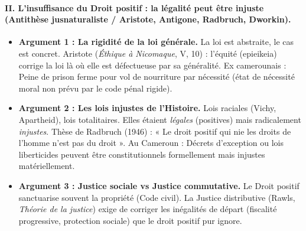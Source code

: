 \documentclass[11pt]{article}
\newcommand{\cle}[1]{{\popxbold\color{popdark}#1}}
\begin{document}
\begin{exoresolu}
    \paragraph{II. L'insuffisance du Droit positif : la légalité peut être injuste (Antithèse jusnaturaliste / Aristote, Antigone, Radbruch, Dworkin).}
    \begin{itemize}
        \item \textbf{Argument 1 : La rigidité de la loi générale.} La loi est abstraite, le cas est concret. Aristote (\emph{Éthique à Nicomaque}, V, 10) : l'équité (\cle{epieikeia}) corrige la loi là où elle est défectueuse par sa généralité. Ex camerounais : Peine de prison ferme pour vol de nourriture par nécessité (état de nécessité moral non prévu par le code pénal rigide).
        \item \textbf{Argument 2 : Les lois injustes de l'Histoire.} Lois raciales (Vichy, Apartheid), lois totalitaires. Elles étaient \emph{légales} (positives) mais radicalement \emph{injustes}. Thèse de Radbruch (1946) : « Le droit positif qui nie les droits de l'homme n'est pas du droit ». Au Cameroun : Décrets d'exception ou lois liberticides peuvent être constitutionnels formellement mais injustes matériellement.
        \item \textbf{Argument 3 : Justice sociale vs Justice commutative.} Le Droit positif sanctuarise souvent la propriété (Code civil). La Justice distributive (Rawls, \emph{Théorie de la justice}) exige de corriger les inégalités de départ (fiscalité progressive, protection sociale) que le droit positif pur ignore.
    \end{itemize}

\end{exoresolu}
\end{document}
